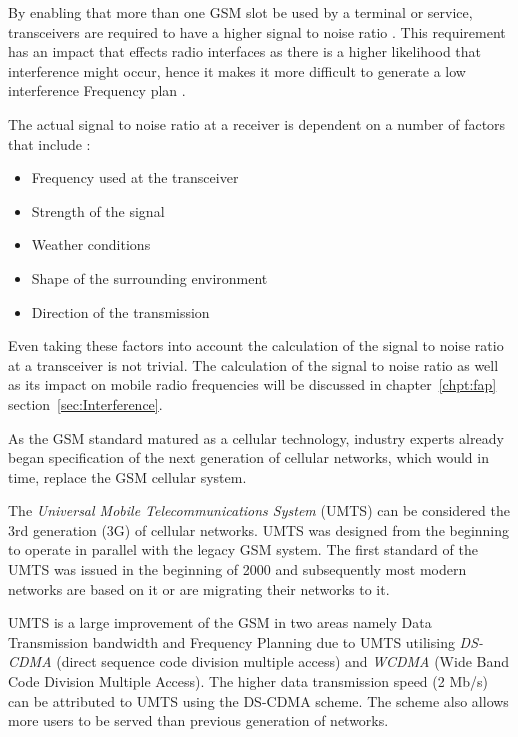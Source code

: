 By enabling that more than one GSM slot be used by a terminal or service, transceivers are required to have a higher signal to noise ratio \cite{GSMArchitectureProtocolsServices,GSMSysEngin}. This requirement has an impact that effects radio interfaces as there is a higher likelihood that interference might occur, hence it makes it more difficult to generate a low interference Frequency plan \cite{Eisenblatter,GSMSysEngin}. 

The actual signal to noise ratio at a receiver is dependent on a number of factors that include \cite{GSMArchitectureProtocolsServices,Karen2004}:
\begin{itemize}
\item Frequency used at the transceiver
\item Strength of the signal
\item Weather conditions
\item Shape of the surrounding environment
\item Direction of the transmission
\end{itemize}
Even taking these factors into account the calculation of the signal to noise ratio at a transceiver is not trivial. The calculation of the signal to noise ratio as well as its impact on mobile radio frequencies will be discussed in chapter~\ref{chpt:fap} section~\ref{sec:Interference}.

As the GSM standard matured as a cellular technology, industry experts already began specification of the next generation of cellular networks, which would in time, replace the GSM cellular system. 

The \emph{Universal Mobile Telecommunications System} (UMTS) can be considered the 3rd generation (3G) of cellular networks. UMTS was designed from the beginning to operate in parallel with the legacy GSM system. The first standard of the UMTS was issued in the beginning of 2000 and subsequently most modern networks are based on it or are migrating their networks to it.

UMTS is a large improvement of the GSM in two areas namely Data Transmission bandwidth and Frequency Planning due to UMTS utilising \emph{DS-CDMA} (direct sequence code division multiple access) and \emph{WCDMA} (Wide Band Code Division Multiple Access). The higher data transmission speed (2 Mb/s) can be attributed to UMTS using the DS-CDMA scheme. The scheme also allows more users to be served than previous generation of networks\cite{tabuglobalplanning3g,Eisenblatter}. 

